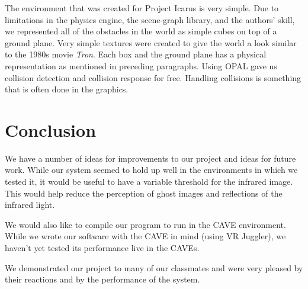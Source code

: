 \documentclass{article}
\begin{document}
The environment that was created for Project Icarus is very simple.  Due to
limitations in the physics engine, the scene-graph library, and the authors'
skill, we represented all of the obstacles in the world as simple cubes on top
of a ground plane.  Very simple textures were created to give the world a look
similar to the 1980s movie \emph{Tron}.  Each box and the ground plane has a physical
representation as mentioned in preceding paragraphs.  Using OPAL gave us
collision detection and collision response for free.  Handling collisions is
something that is often done in the graphics.

\section{Conclusion}
We have a number of ideas for improvements to our project and ideas for future
work.  While our system seemed to hold up well in the environments in which we
tested it, it would be useful to have a variable threshold for the infrared
image.  This would help reduce the perception of ghost images and reflections
of the infrared light.  

We would also like to compile our program to run in the CAVE environment.
While we wrote our software with the CAVE in mind (using VR Juggler), we
haven't yet tested its performance live in the CAVEs.

We demonstrated our project to many of our classmates and were very pleased
by their reactions and by the performance of the system.  
\end{document}
